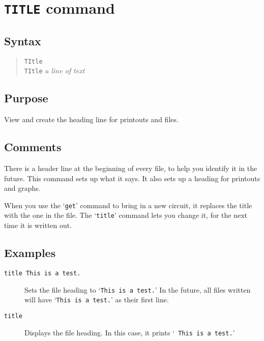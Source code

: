\section{{\tt TITLE} command}
\subsection{Syntax}
\begin{verse}
{\tt TItle}\\
{\tt TItle} {\it a line of text}
\end{verse}
\subsection{Purpose}

View and create the heading line for printouts and files.
\subsection{Comments}

There is a header line at the beginning of every file, to help you identify
it in the future.  This command sets up what it says.  It also sets up a
heading for printouts and graphs.

When you use the `{\tt get}' command to bring in a new circuit, it replaces the
title with the one in the file.  The `{\tt title}' command lets you change it,
for the next time it is written out.
\subsection{Examples}

\begin{description}

\item[{\tt title This is a test.}] Sets the file heading to `{\tt This is a
test.}' In the future, all files written will have `{\tt This is a test.}'
as their first line.

\item[{\tt title}] Displays the file heading.  In this case, it prints `{\tt
This is a test.}'

\end{description}
